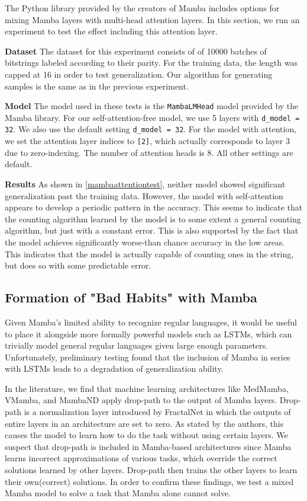 The Python library provided by the creators of Mamba\cite{mamba} includes
options for mixing Mamba layers with multi-head attention layers.
In this section, we run an experiment to test the effect including this
attention layer.

\textbf{Dataset}
The dataset for this experiment consists of of 10000 batches of bitstrings
labeled according to their parity.
For the training data, the length was capped at 16 in order to test
generalization.
Our algorithm for generating samples is the same as in the previous experiment.

\textbf{Model}
The model used in these tests is the \verb|MambaLMHead| model provided by the
Mamba library.
For our self-attention-free model, we use 5 layers with \verb|d_model = 32|.
We also use the default setting \verb|d_model = 32|.
For the model with attention, we set the attention layer indices to \verb|[2]|,
which actually corresponds to layer 3 due to zero-indexing.
The number of attention heads is 8.
All other settings are default.

\textbf{Results}
As shown in \ref{mambaattentiontest}, neither model showed significant
generalization past the training data.
However, the model with self-attention appears to develop a periodic pattern in
the accuracy.
This seems to indicate that the counting algorithm learned by the model is to
some extent a general counting algorithm, but just with a constant error.
This is also supported by the fact that the model achieves significantly
worse-than chance accuracy in the low areas.
This indicates that the model is actually capable of counting ones in the
string, but does so with some predictable error.

\subsection{Formation of "Bad Habits" with Mamba}
Given Mamba's limited ability to recognize regular languages, it would be useful
to place it alongside more formally powerful models such as LSTMs, which can
trivially model general regular languages given large enough
parameters\cite{lstmformal}. Unfortunately, preliminary testing found that the
inclusion of Mamba in series with LSTMs leads to a degradation of generalization
ability.

In the literature, we find that machine learning architectures like
MedMamba\cite{medmamba}, VMamba\cite{vmamba}, and MambaND\cite{mamband} apply
drop-path to the output of Mamba layers.
Drop-path is a normalization layer introduced by FractalNet\cite{fractalnet} in
which the outputs of entire layers in an architecture are set to zero.
As stated by the authors, this causes the model to learn how to do the task
without using certain layers.
We suspect that drop-path is included in Mamba-based architectures since Mamba
learns incorrect approximations of various tasks, which override the correct
solutions learned by other layers.
Drop-path then trains the other layers to learn their own(correct) solutions.
In order to confirm these findings, we test a mixed Mamba model to solve a task
that Mamba alone cannot solve.

